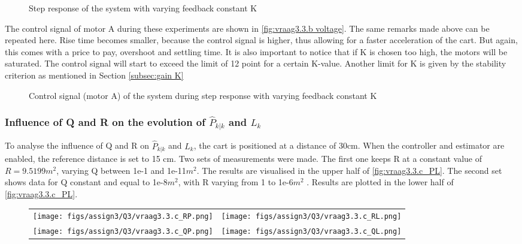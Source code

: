 \documentclass[a4paper]{article}
\begin{document}
\begin{figure}[H]
    \caption{Step response of the system with varying feedback constant K}
    \label{fig:vraag3.3.b}
\end{figure}

The control signal of motor A during these experiments are shown in \autoref{fig:vraag3.3.b voltage}. The same remarks made above can be repeated here. Rise time becomes smaller, because the control signal is higher, thus allowing for a faster acceleration of the cart. But again, this comes with a price to pay, overshoot and settling time. It is also important to notice that if K is chosen too high, the motors will be saturated. The control signal will start to exceed the limit of 12 point for a certain K-value. Another limit for K is given by the stability criterion as mentioned in Section \ref{subsec:gain K}

\begin{figure}[H]
    \caption{Control signal (motor A) of the system during step response with varying feedback constant K}
    \label{fig:vraag3.3.b voltage}
\end{figure}


\subsubsection{Influence of Q and R on the evolution of \(\hat{P}_{k|k}\) and \(L_{k}\)}
To analyse the influence of Q and R on \(\hat{P}_{k|k}\) and \(L_{k}\), the cart is positioned at a distance of 30cm. When the controller and estimator are enabled, the reference distance is set to 15 cm. Two sets of measurements were made. The first one keeps R at a constant value of \(R=9.5199m^2\), varying Q between 1e-1 and 1e-11\(m^2\). The results are visualised in the upper half of \autoref{fig:vraag3.3.c_PL}. The second set shows data for Q constant and equal to 1e-8\(m^2\), with R varying from 1 to 1e-6\(m^2\) . Results are plotted in the lower half of \autoref{fig:vraag3.3.c_PL}.

\begin{figure}[H]
\begin{adjustwidth}{-3cm}{-3cm}
\centering
\begin{tabular}{cc}
  \texttt{[image: figs/assign3/Q3/vraag3.3.c\_RP.png]} &   \texttt{[image: figs/assign3/Q3/vraag3.3.c\_RL.png]} \\
  
  \texttt{[image: figs/assign3/Q3/vraag3.3.c\_QP.png]} & \texttt{[image: figs/assign3/Q3/vraag3.3.c\_QL.png]} \\
\end{tabular}
\end{adjustwidth}
\label{fig:vraag3.3.c_PL}
\end{figure}
\end{document}

